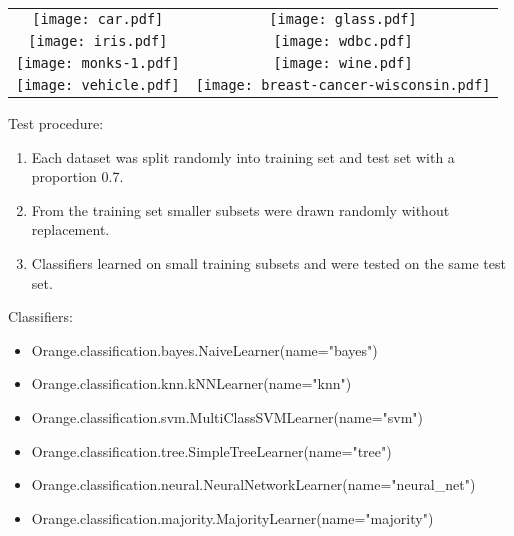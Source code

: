 \documentclass[a4paper]{article}
\begin{document}
\begin{center}
\begin{tabular}{cc}
\texttt{[image: car.pdf]} & \texttt{[image: glass.pdf]}\\
\texttt{[image: iris.pdf]} & \texttt{[image: wdbc.pdf]}\\
\texttt{[image: monks-1.pdf]} & \texttt{[image: wine.pdf]}\\
\texttt{[image: vehicle.pdf]} & \texttt{[image: breast-cancer-wisconsin.pdf]}\\
\end{tabular}
\end{center}
\restoregeometry

Test procedure:
\begin{enumerate}
\item Each dataset was split randomly into training set and test set with a proportion 0.7.
\item From the training set smaller subsets were drawn randomly without replacement.
\item Classifiers learned on small training subsets and were tested on the same test set.
\end{enumerate}

Classifiers:
\begin{itemize}
\item Orange.classification.bayes.NaiveLearner(name="bayes")
\item Orange.classification.knn.kNNLearner(name="knn")
\item Orange.classification.svm.MultiClassSVMLearner(name="svm")
\item Orange.classification.tree.SimpleTreeLearner(name="tree")
\item Orange.classification.neural.NeuralNetworkLearner(name="neural\_net")
\item Orange.classification.majority.MajorityLearner(name="majority")
\end{itemize}
\end{document}
